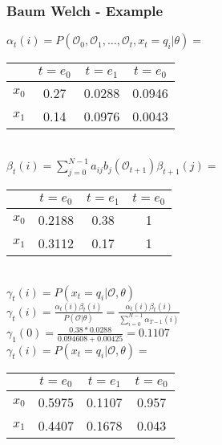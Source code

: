 \begin{frame}
	\frametitle{Baum Welch - Example}
  \begin{table}
  $\alpha_t(i) = P(\mathcal{O}_0, \mathcal{O}_1, \dots ,\mathcal{O}_t , x_t = q_i | \theta) =$
  \begin{tabular}{| c | c | c | c |}
  	\hline
          & $t=e_0$ & $t=e_1$ & $t=e_0$ \\ \hline
    $x_0$ & 0.27    & 0.0288  & 0.0946 \\ \hline
    $x_1$ & 0.14    & 0.0976  & 0.0043 \\ \hline
  \end{tabular}\\
  $\beta_t(i) = \sum\limits_{j=0}^{N-1} a_{ij} b_j(\mathcal{O}_{t+1})\beta_{t+1}(j) =$
  \begin{tabular}{| c | c | c | c |}
  	\hline
          & $t=e_0$ & $t=e_1$ & $t=e_0$ \\ \hline
    $x_0$ & 0.2188  & 0.38    & 1       \\ \hline
    $x_1$ & 0.3112  & 0.17    & 1       \\ \hline
  \end{tabular}\\
  $\gamma_t(i) = P(x_t = q_i|\mathcal{O},\theta)$\\
  $\gamma_t(i) = \frac{\alpha_t(i)\beta_t(i)}{P(\mathcal{O}|\theta)} = \frac{\alpha_t(i)\beta_t(i)}{\sum\limits_{i=0}^{N-1} \alpha_{T-1}(i)}$\\
  $\gamma_1(0) = \frac{0.38 * 0.0288}{0.094608 + 0.00425} = 0.1107$\\
  $\gamma_t(i) = P(x_t = q_i|\mathcal{O},\theta) =$
  \begin{tabular}{| c | c | c | c |}
  	\hline
          & $t=e_0$ & $t=e_1$ & $t=e_0$ \\ \hline
    $x_0$ & 0.5975  & 0.1107  & 0.957   \\ \hline
    $x_1$ & 0.4407  & 0.1678  & 0.043   \\ \hline
  \end{tabular}\\
\end{table}
\end{frame}

